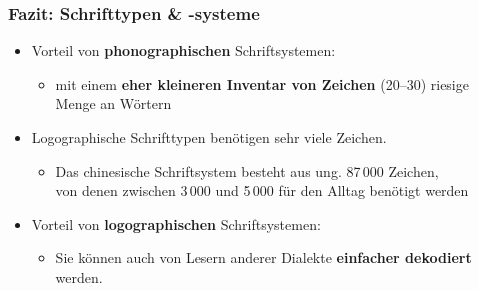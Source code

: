 \begin{frame}
\frametitle{Fazit: Schrifttypen \& -systeme}

\begin{itemize}
	\item Vorteil von \textbf{phonographischen} Schriftsystemen:
	
	\begin{itemize}
		\item mit einem \textbf{eher kleineren Inventar von Zeichen} (20--30) \ras riesige Menge an Wörtern
	\end{itemize}
	
	\item Logographische Schrifttypen benötigen sehr viele Zeichen.
	
	\begin{itemize}
		\item Das chinesische Schriftsystem besteht aus ung. 87\,000 Zeichen,\\
                  von denen zwischen 3\,000 und 5\,000 für den Alltag benötigt werden
	\end{itemize}
	
\pause 	

	\item Vorteil von \textbf{logographischen} Schriftsystemen:
	\begin{itemize}
		\item Sie können auch von Lesern anderer Dialekte \textbf{einfacher dekodiert} werden.
	\end{itemize}	
\end{itemize}
\end{frame}


